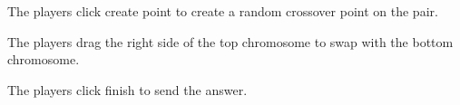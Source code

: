 \documentclass[12pt,oneside,openright,a4paper]{cpe-english-project}
\begin{document}
\begin{itemize}
\begin{enumerate}
		The players click create point to create a random crossover point on the pair. \\
		\begin{minipage}[c]{\textwidth}\centering {}  \end{minipage}
		The players drag the right side of the top chromosome to swap with the bottom chromosome. \\
		\begin{minipage}[c]{\textwidth}\centering {}  \end{minipage}
		The players click finish to send the answer. \\


\end{enumerate}
\end{itemize}
\end{document}
